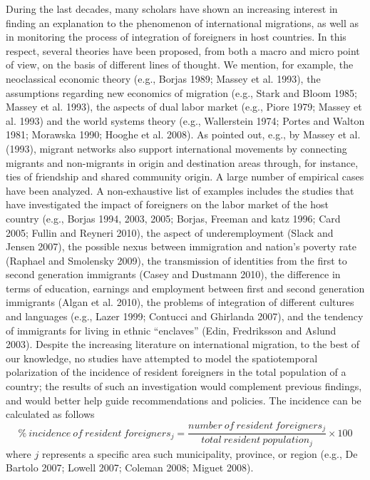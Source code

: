 \documentclass[10pt] {article}
\newcommand{\beq}{\begin{equation}}
\newcommand{\eeq}{\end{equation}}
\theoremstyle{definition}
\theoremstyle{plain}
\begin{document}
During the last decades, many scholars have shown an increasing interest in finding an explanation to the phenomenon of international migrations, as well as in monitoring the process of integration of foreigners in host countries. In this respect, several theories have been proposed, from both a macro and micro point of view, on the basis of different lines of thought. We mention, for example, the neoclassical economic theory (e.g., Borjas 1989; Massey et al. 1993), the assumptions regarding new economics of migration (e.g., Stark and Bloom 1985; Massey et al. 1993), the aspects of dual labor market (e.g., Piore 1979; Massey et al. 1993) and the world systems theory (e.g., Wallerstein 1974; Portes and Walton 1981; Morawska 1990; Hooghe et al. 2008). As pointed out, e.g., by Massey et al. (1993), migrant networks also support international movements by connecting migrants and non-migrants in origin and destination areas through, for instance, ties of friendship and shared community origin. A large number of empirical cases have been analyzed. A non-exhaustive list of examples includes the studies that have investigated the impact of foreigners on the labor market of the host country (e.g., Borjas 1994, 2003, 2005; Borjas, Freeman and katz 1996; Card 2005; Fullin and Reyneri 2010), the aspect of underemployment (Slack and Jensen 2007), the possible nexus between immigration and nation's poverty rate (Raphael and Smolensky 2009), the transmission of identities from the first to second generation immigrants (Casey and Dustmann 2010), the difference in terms of education, earnings and employment between first and second generation immigrants (Algan et al. 2010), the problems of integration of different cultures and languages (e.g., Lazer 1999; Contucci and Ghirlanda 2007), and the tendency of immigrants for living in ethnic ``enclaves'' (Edin, Fredriksson and Aslund 2003). Despite the increasing literature on international migration, to the best of our knowledge, no studies have attempted to model the spatiotemporal polarization of the incidence of resident foreigners in the total population of a country; the results of such an investigation would complement previous findings, and would better help guide recommendations and policies. The incidence can be calculated as follows
\beq
\% \ incidence \ of \ resident \ foreigners_j  = \frac{number \ of \ resident \ foreigners_j}{total \ resident \ population_j} \times 100
\label{first.d1}
\eeq
where $j$ represents a specific area such municipality, province, or region (e.g., De Bartolo 2007; Lowell 2007; Coleman 2008; Miguet 2008).
\end{document}
